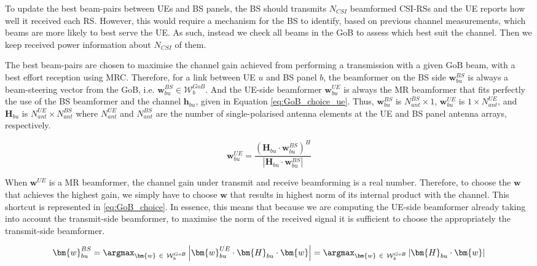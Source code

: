To update the best beam-pairs between UEs and BS panels, the BS should transmits $N_{CSI}$ beamformed CSI-RSs and the UE reports how well it received each RS. However, this would require a mechanism for the BS to identify, based on previous channel measurements, which beams are more likely to best serve the UE. As such, instead we check all beams in the \ac{GoB} to assess which best suit the channel. Then we keep received power information about $N_{CSI}$ of them.

The best beam-pairs are chosen to maximise the channel gain achieved from performing a transmission with a given GoB beam, with a best effort reception using \acs{MRC}. Therefore, for a link between UE $u$ and BS panel $b$, the beamformer on the BS side $\bm{w}^{BS}_{bu}$ is always a beam-steering vector from the GoB, i.e. $\bm{w}^{BS}_{bu} \in \mathcal{W}^{GoB}_b$. And the UE-side beamformer $\bm{w}^{UE}_{bu}$ is always the \ac{MR} beamformer that fits perfectly the use of the BS beamformer and the channel $\bm{h}_{bu}$, given in Equation \ref{eq:GoB_choice_ue}. Thus, $\bm{w}^{BS}_{bu}$ is $N_{ant}^{BS} \times 1$, $\bm{w}^{UE}_{bu}$ is $1 \times N_{ant}^{UE}$, and $\bm{H}_{bu}$ is $N_{ant}^{UE} \times N_{ant}^{BS}$ where $N_{ant}^{UE}$ and $N_{ant}^{BS}$ are the number of single-polarised antenna elements at the UE and BS panel antenna arrays, respectively.


\begin{equation} \label{eq:GoB_choice_ue}
    \bm{w}^{UE}_{bu} = \frac{\left(\bm{H}_{bu} \cdot \bm{w}^{BS}_{bu}\right)^H}{\left|\bm{H}_{bu} \cdot \bm{w}^{BS}_{bu}\right|}
\end{equation}


When $\bm{w}^{UE}$ is a MR beamformer, the channel gain under transmit and receive beamforming is a real number. Therefore, to choose the $\bm{w}$ that achieves the highest gain, we simply have to choose $\bm{w}$ that results in highest norm of its internal product with the channel. This shortcut is represented in \eqref{eq:GoB_choice}. In essence, this means that because we are computing the UE-side beamformer already taking into account the transmit-side beamformer, to maximise the norm of the received signal it is sufficient to choose the appropriately the transmit-side beamformer. 

\begin{equation} \label{eq:GoB_choice}
    \bm{w}^{BS}_{bu} = \argmax_{\bm{w} \ \in \ \mathcal{W}^{GoB}_b} \left| \bm{w}^{UE}_{bu} \cdot \bm{H}_{bu} \cdot \bm{w} \right| = \argmax_{\bm{w} \ \in \ \mathcal{W}^{GoB}_b} \left| \bm{H}_{bu} \cdot \bm{w}\right|
\end{equation}

